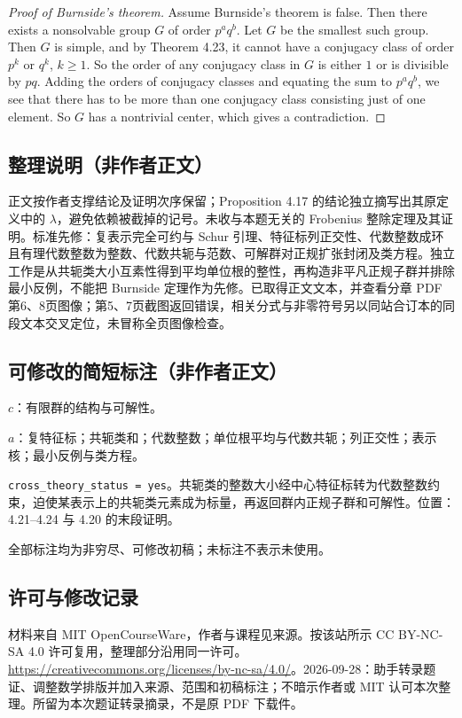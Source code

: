 \documentclass[UTF8,11pt]{ctexart}
\theoremstyle{definition}
\begin{document}
\begin{proof}[Proof of Burnside's theorem]
Assume Burnside's theorem is false. Then there exists a nonsolvable group $G$ of order $p^aq^b$. Let $G$ be the smallest such group. Then $G$ is simple, and by Theorem 4.23, it cannot have a conjugacy class of order $p^k$ or $q^k$, $k\geq1$. So the order of any conjugacy class in $G$ is either $1$ or is divisible by $pq$. Adding the orders of conjugacy classes and equating the sum to $p^aq^b$, we see that there has to be more than one conjugacy class consisting just of one element. So $G$ has a nontrivial center, which gives a contradiction.
\end{proof}

\subsection*{整理说明（非作者正文）}
正文按作者支撑结论及证明次序保留；Proposition 4.17 的结论独立摘写出其原定义中的 $\lambda$，避免依赖被截掉的记号。未收与本题无关的 Frobenius 整除定理及其证明。标准先修：复表示完全可约与 Schur 引理、特征标列正交性、代数整数成环且有理代数整数为整数、代数共轭与范数、可解群对正规扩张封闭及类方程。独立工作是从共轭类大小互素性得到平均单位根的整性，再构造非平凡正规子群并排除最小反例，不能把 Burnside 定理作为先修。已取得正文文本，并查看分章 PDF 第6、8页图像；第5、7页截图返回错误，相关分式与非零符号另以同站合订本的同段文本交叉定位，未冒称全页图像检查。
\subsection*{可修改的简短标注（非作者正文）}
$c$：有限群的结构与可解性。

$a$：复特征标；共轭类和；代数整数；单位根平均与代数共轭；列正交性；表示核；最小反例与类方程。

\texttt{cross\_theory\_status = yes}。共轭类的整数大小经中心特征标转为代数整数约束，迫使某表示上的共轭类元素成为标量，再返回群内正规子群和可解性。位置：4.21--4.24 与 4.20 的末段证明。

全部标注均为非穷尽、可修改初稿；未标注不表示未使用。
\subsection*{许可与修改记录}
材料来自 MIT OpenCourseWare，作者与课程见来源。按该站所示 CC BY-NC-SA 4.0 许可复用，整理部分沿用同一许可。\url{https://creativecommons.org/licenses/by-nc-sa/4.0/}。2026-09-28：助手转录题证、调整数学排版并加入来源、范围和初稿标注；不暗示作者或 MIT 认可本次整理。所留为本次题证转录摘录，不是原 PDF 下载件。
\end{document}
